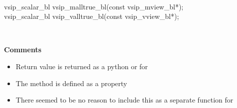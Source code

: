 \\\cvsiplh
\begin{cfuncs}
vsip\_scalar\_bl vsip\_malltrue\_bl(const vsip\_mview\_bl*);\Bs\\
vsip\_scalar\_bl vsip\_valltrue\_bl(const vsip\_vview\_bl*);\Bs\\
\end{cfuncs}
\pyjvsiph
{}
\\\begin{minipage}{\textwidth}
\hspace*{.04\textwidth}\textbf{Comments}\\ 
\hspace*{.04\textwidth}\parbox{.95\textwidth}
{\vspace*{.1cm}
\begin{itemize}
\item{Return value  is returned as a python  or  for \pyjv}
\item{The  method is defined as a property}
\item{There seemed to be no reason to include this as a separate function for \pyjv}
\end{itemize}
}
\end{minipage}